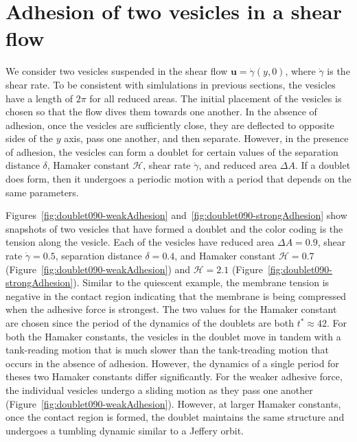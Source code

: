 \documentclass[prf,superscriptaddress,showkeys,longbibliography]{revtex4-1}
\newcommand{\uu}{\mathbf{u}}
\begin{document}
\section{Adhesion of two vesicles in a shear flow}
\label{sec:sflow} 
We consider two vesicles suspended in the shear flow $\uu =
\dot\gamma(y,0)$, where $\dot\gamma$ is the shear rate.  To be
consistent with simlulations in previous sections, the vesicles have a
length of $2\pi$ for all reduced areas.  The initial placement of the
vesicles is chosen so that the flow dives them towards one another.  In
the absence of adhesion, once the vesicles are sufficiently close, they
are deflected to opposite sides of the $y$ axis, pass one another, and
then separate.  However, in the presence of adhesion, the vesicles can
form a doublet for certain values of the separation distance $\delta$,
Hamaker constant $\mathcal{H}$, shear rate $\dot\gamma$, and reduced
area $\Delta A$.  If a doublet does form, then it undergoes a periodic
motion with a period that depends on the same parameters.

Figures~\ref{fig:doublet090-weakAdhesion}
and~\ref{fig:doublet090-strongAdhesion} show snapshots of two vesicles
that have formed a doublet and the color coding is the tension along the
vesicle.  Each of the vesicles have reduced area $\Delta A = 0.9$, shear
rate $\dot\gamma = 0.5$, separation distance $\delta = 0.4$, and Hamaker
constant $\mathcal{H} = 0.7$ (Figure~\ref{fig:doublet090-weakAdhesion})
and $\mathcal{H} = 2.1$ (Figure~\ref{fig:doublet090-strongAdhesion}).
Similar to the quiescent example, the membrane tension is negative in
the contact region indicating that the membrane is being compressed when
the adhesive force is strongest.  The two values for the Hamaker
constant are chosen since the period of the dynamics of the doublets are
both $t^* \approx 42$.  For both the Hamaker constants, the vesicles in
the doublet move in tandem with a tank-reading motion that is much
slower than the tank-treading motion that occurs in the absence of
adhesion.  However, the dynamics of a single period for theses two
Hamaker constants differ significantly.  For the weaker adhesive force,
the individual vesicles undergo a sliding motion as they pass one
another (Figure~\ref{fig:doublet090-weakAdhesion}).  However, at larger
Hamaker constants, once the contact region is formed, the doublet
maintains the same structure and undergoes a tumbling dynamic similar to
a Jeffery orbit.
\end{document}
